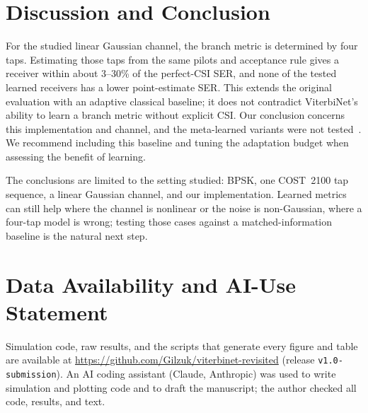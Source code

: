 \documentclass[journal]{IEEEtran}
\begin{document}
\section{Discussion and Conclusion}
For the studied linear Gaussian channel, the branch metric is determined by four taps. Estimating those taps from the same pilots and acceptance rule gives a receiver within about 3--30\% of the perfect-CSI SER, and none of the tested learned receivers has a lower point-estimate SER. This extends the original evaluation with an adaptive classical baseline; it does not contradict ViterbiNet's ability to learn a branch metric without explicit CSI. Our conclusion concerns this implementation and channel, and the meta-learned variants were not tested~\cite{raviv2021metaviterbinet,raviv2023online}. We recommend including this baseline and tuning the adaptation budget when assessing the benefit of learning.

The conclusions are limited to the setting studied: BPSK, one COST~2100 tap sequence, a linear Gaussian channel, and our implementation. Learned metrics can still help where the channel is nonlinear or the noise is non-Gaussian, where a four-tap model is wrong; testing those cases against a matched-information baseline is the natural next step.

\section*{Data Availability and AI-Use Statement}
Simulation code, raw results, and the scripts that generate every figure and table are available at \url{https://github.com/Gilzuk/viterbinet-revisited} (release \texttt{v1.0-submission}). An AI coding assistant (Claude, Anthropic) was used to write simulation and plotting code and to draft the manuscript; the author checked all code, results, and text.



\end{document}
